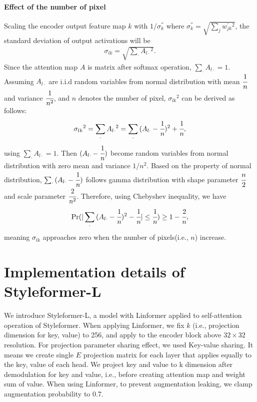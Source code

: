 \documentclass[10pt,twocolumn,letterpaper]{article}
\begin{document}
\paragraph{Effect of the number of pixel}
Scaling the encoder output feature map $k$ with  $1/\sigma^{''}_{k}$ where
    $\sigma^{''}_{k} = \sqrt{\sum_{j}{w^{'}_{jk}{^2}}}$, the standard deviation of output activations will be 
\begin{align}
    \sigma_{lk} = \sqrt{\sum_{\cdot}{A_{l\cdot}{^2}}}.
\end{align}
Since the attention map $A$ is matrix after softmax operation, $\sum_{\cdot}{A_{l\cdot}}=1$. Assuming $A_{l\cdot}$ are i.i.d random variables from normal distribution with mean $\cfrac{1}{n}$ and variance $\cfrac{1}{n{^2}}$, and $n$ denotes the number of pixel, $\sigma_{lk}{^2}$ can be derived as follows:
\begin{align}
    \sigma_{lk}{^2} = \sum_{\cdot}{A_{l\cdot}{^2}} = \sum_{\cdot}{(A_{l\cdot}-\cfrac{1}{n})}{^2} + \cfrac{1}{n},
\end{align}
using $\sum_{\cdot}{A_{l\cdot}}=1$. Then $(A_{l\cdot}-\cfrac{1}{n})$ become random variables from normal distribution with zero mean and variance $1/n{^2}$. Based on the property of normal distribution, $\sum_{\cdot}{(A_{l\cdot}-\cfrac{1}{n})}$ follows gamma distribution with shape parameter $\cfrac{n}{2}$ and scale parameter $\cfrac{2}{n{^2}}$. Therefore, using Chebyshev inequality, we have 
\begin{align}
    \Pr(|\sum_{\cdot}{(A_{l\cdot}-\cfrac{1}{n})}{^2}-\cfrac{1}{n}|\leq\cfrac{1}{n})\geq1-\cfrac{2}{n},
\end{align}
meaning $\sigma_{lk}$ approaches zero when the number of pixels(i.e., $n$) increase. 

\section{Implementation details of Styleformer-L}
\label{app:E}
We introduce Styleformer-L, a model with Linformer applied to self-attention operation of Styleformer. When applying Linformer, we fix $k$ (i.e., projection dimension for key, value) to 256, and apply to the encoder block above $32 \times 32$ resolution. For projection parameter sharing effect, we used Key-value sharing. It means we create single $E$ projection matrix for each layer that applies equally to the key, value of each head. We project key and value to k dimension after demodulation for key and value, i.e., before creating attention map and weight sum of value. When using Linformer, to prevent augmentation leaking, we clamp augmentation probability to 0.7.
\end{document}

